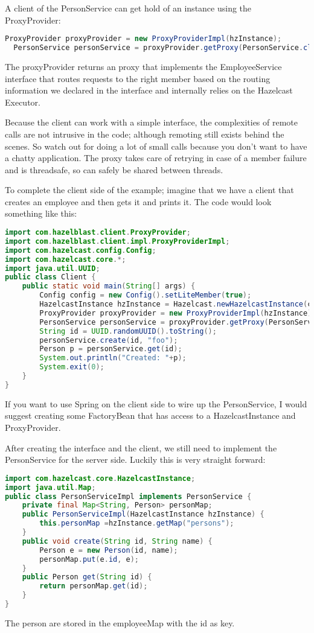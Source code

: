 A client of the PersonService can get hold of an instance using the ProxyProvider:
\begin{lstlisting}[language=java]
  ProxyProvider proxyProvider = new ProxyProviderImpl(hzInstance);
  PersonService personService = proxyProvider.getProxy(PersonService.class);
\end{lstlisting}
The proxyProvider returns an proxy that implements the EmployeeService interface that routes requests to the right member based on the routing information we declared in the interface and internally relies on the Hazelcast Executor. 

Because the client can work with a simple interface, the complexities of remote calls are not intrusive in the code; although remoting still exists behind the scenes. So watch out for doing a lot of small calls because you don't want to have a chatty application. The proxy takes care of retrying in case of a member failure and is threadsafe, so can safely be shared between threads. 

To complete the client side of the example; imagine that we have a client that creates an employee and then gets it and prints it. The code would look something like this:
\begin{lstlisting}[language=java]
import com.hazelblast.client.ProxyProvider;
import com.hazelblast.client.impl.ProxyProviderImpl;
import com.hazelcast.config.Config;
import com.hazelcast.core.*;
import java.util.UUID;
public class Client {
    public static void main(String[] args) {
        Config config = new Config().setLiteMember(true);
        HazelcastInstance hzInstance = Hazelcast.newHazelcastInstance(config);
        ProxyProvider proxyProvider = new ProxyProviderImpl(hzInstance);
        PersonService personService = proxyProvider.getProxy(PersonService.class);
        String id = UUID.randomUUID().toString();
        personService.create(id, "foo");
        Person p = personService.get(id);
        System.out.println("Created: "+p);
        System.exit(0);
    }
}
\end{lstlisting}
If you want to use Spring on the client side to wire up the PersonService, I would suggest creating some FactoryBean that has access to a HazelcastInstance and ProxyProvider.

After creating the interface and the client, we still need to implement the PersonService for the server side. Luckily this is very straight forward:
\begin{lstlisting}[language=java]
import com.hazelcast.core.HazelcastInstance;
import java.util.Map;
public class PersonServiceImpl implements PersonService {
    private final Map<String, Person> personMap;
    public PersonServiceImpl(HazelcastInstance hzInstance) {
        this.personMap =hzInstance.getMap("persons");
    }
    public void create(String id, String name) {
        Person e = new Person(id, name);
        personMap.put(e.id, e);
    }
    public Person get(String id) {
        return personMap.get(id);
    }
}
\end{lstlisting}
The person are stored in the employeeMap with the id as key. 

